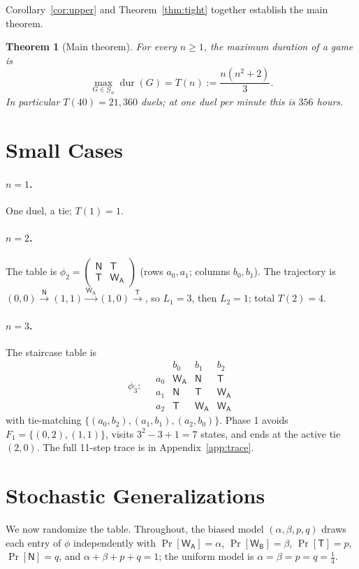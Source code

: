 \documentclass[11pt]{article}
\newtheorem{theorem}{Theorem}
\theoremstyle{definition}
\theoremstyle{remark}
\DeclareMathOperator{\dur}{dur}
\newcommand{\WA}{\mathsf{W_A}}
\newcommand{\WB}{\mathsf{W_B}}
\newcommand{\TT}{\mathsf{T}}
\newcommand{\NN}{\mathsf{N}}
\begin{document}
Corollary~\ref{cor:upper} and Theorem~\ref{thm:tight} together establish the main theorem.

\begin{theorem}[Main theorem]\label{thm:main}
For every $n \ge 1$, the maximum duration of a game is
\begin{equation}
\max_{G \in \mathcal G_n} \dur(G) = T(n) := \frac{n(n^2 + 2)}{3}.
\end{equation}
In particular $T(40) = 21{,}360$ duels; at one duel per minute this is $356$ hours.
\end{theorem}

\section{Small Cases}\label{sec:small}
\paragraph{$n = 1$.} One duel, a tie; $T(1) = 1$.

\paragraph{$n = 2$.} The table is $\phi_2 = \left(\begin{smallmatrix}\NN & \TT\\ \TT & \WA\end{smallmatrix}\right)$
(rows $a_0, a_1$; columns $b_0, b_1$). The trajectory is
$(0, 0) \xrightarrow{\NN} (1, 1) \xrightarrow{\WA} (1, 0) \xrightarrow{\TT}$, so $L_1 = 3$, then $L_2 = 1$; total
$T(2) = 4$.

\paragraph{$n = 3$.} The staircase table is
\[
\phi_3:\quad
\begin{array}{c|ccc}
 & b_0 & b_1 & b_2\\\hline
a_0 & \WA & \NN & \TT\\
a_1 & \NN & \TT & \WA\\
a_2 & \TT & \WA & \WA
\end{array}
\]
with tie-matching $\{(a_0, b_2), (a_1, b_1), (a_2, b_0)\}$. Phase 1 avoids $F_1 = \{(0, 2), (1, 1)\}$, visits
$3^2 - 3 + 1 = 7$ states, and ends at the active tie $(2, 0)$. The full 11-step trace is in Appendix~\ref{app:trace}.

\section{Stochastic Generalizations}\label{sec:stoch}
We now randomize the table. Throughout, the biased model $(\alpha, \beta, p, q)$ draws each entry of $\phi$
independently with $\Pr[\WA] = \alpha$, $\Pr[\WB] = \beta$, $\Pr[\TT] = p$, $\Pr[\NN] = q$, and
$\alpha + \beta + p + q = 1$; the uniform model is $\alpha = \beta = p = q = \tfrac14$.
\end{document}
